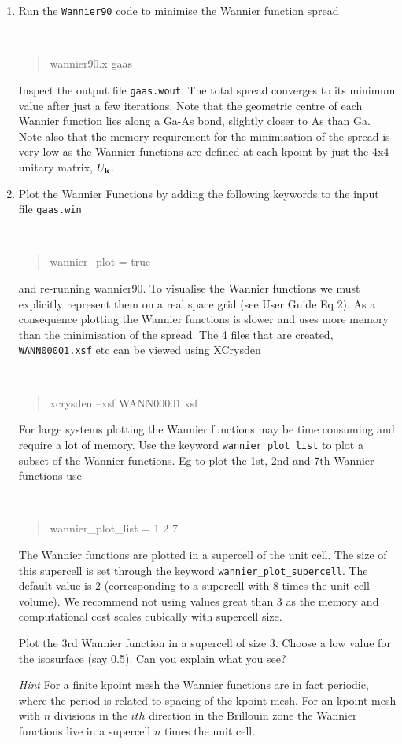 \documentclass[a4paper,11pt,twoside]{article}
\begin{document}
\begin{enumerate}
\item Run the {\tt Wannier90} code to minimise the Wannier function spread
{\tt
\begin{quote}
wannier90.x gaas
\end{quote} }
Inspect the output file {\tt gaas.wout}. The total spread converges to its
minimum value after just a few iterations. Note that the geometric centre of
each Wannier function lies along a Ga-As bond, slightly closer to As than Ga. Note also that the memory requirement for the minimisation of the spread is very low as the Wannier functions are defined at each kpoint by just the 4x4 unitary matrix, $U_{{\bf k}}$.
\item Plot the Wannier Functions by adding the following keywords to the input file {\tt gaas.win}
{\tt
\begin{quote}
wannier\_plot = true
\end{quote} }
and re-running wannier90. To visualise the Wannier functions we must explicitly represent them on
a real space grid (see User Guide Eq 2). As a consequence plotting the Wannier functions is slower and uses more memory than the minimisation of the spread. The 4 files that are created, {\tt WANN00001.xsf} etc can be viewed using XCrysden
{\tt
\begin{quote}
xcrysden --xsf WANN00001.xsf
\end{quote} }

For large systems plotting the Wannier functions may be time consuming and require a lot of memory. Use the keyword {\tt wannier\_plot\_list} to plot a subset of the Wannier functions. Eg to plot the 1st, 2nd and 7th Wannier functions use
{\tt
\begin{quote}
wannier\_plot\_list = 1 2 7
\end{quote} }
The Wannier functions are plotted in a supercell of the unit cell. The size of this supercell is set through the keyword {\tt wannier\_plot\_supercell}. The default value is 2 (corresponding to a supercell with 8 times the unit cell volume). We recommend not using values great than 3 as the memory and computational cost scales cubically with  supercell size. 

Plot the 3rd Wannier function in a supercell of size 3. Choose a low value for the isosurface (say 0.5). Can you explain what you see?


{\it Hint} For a finite kpoint mesh the Wannier functions are in fact periodic, where the period is related to spacing of the kpoint mesh. For an kpoint mesh with $n$ divisions in the $ith$ direction in the Brillouin zone the Wannier functions live in a supercell $n$ times the unit cell.
\end{enumerate}
\end{document}

